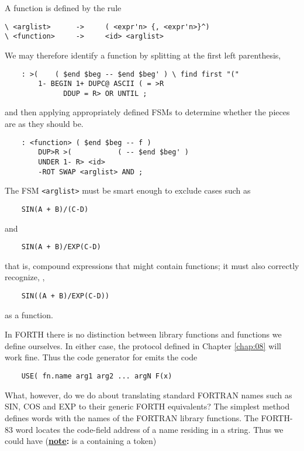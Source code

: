 A function is defined by the rule

\begin{verbatim}
\ <arglist>      ->     ( <expr'n> {, <expr'n>}^)
\ <function>     ->     <id> <arglist>
\end{verbatim}

We may therefore identify a function by splitting at the first left parenthesis,

\begin{lstlisting}
    : >(    ( $end $beg -- $end $beg' ) \ find first "("
        1- BEGIN 1+ DUPC@ ASCII ( = >R
              DDUP = R> OR UNTIL ;
\end{lstlisting}

and then applying appropriately defined FSMs to determine whether the pieces are as they should be.

\begin{lstlisting}
    : <function> ( $end $beg -- f )
        DUP>R >(           ( -- $end $beg' )
        UNDER 1- R> <id>
        -ROT SWAP <arglist> AND ;
\end{lstlisting}

The FSM \texttt{<arglist>} must be smart enough to exclude cases such as

\begin{lstlisting}
    SIN(A + B)/(C-D)
\end{lstlisting}

and

\begin{lstlisting}
    SIN(A + B)/EXP(C-D)
\end{lstlisting}

that is, compound expressions that might contain functions; it must also correctly recognize, \eg,

\begin{lstlisting}
    SIN((A + B)/EXP(C-D))
\end{lstlisting}

as a function.

In FORTH there is no distinction between library functions and functions we define ourselves. In either case, the protocol defined in Chapter \ref{chap:08} will work fine. Thus the code generator for  emits the code

\begin{lstlisting}
    USE( fn.name arg1 arg2 ... argN F(x)
\end{lstlisting}

What, however, do we do about translating standard FORTRAN names such as SIN, COS and EXP to their generic FORTH equivalents? The simplest method defines words with the names of the FORTRAN library functions. The FORTH-83 word  locates the code-field address of a name residing in a string. Thus we could have (\textbf{\underline{note}:}  is a  containing a token)

